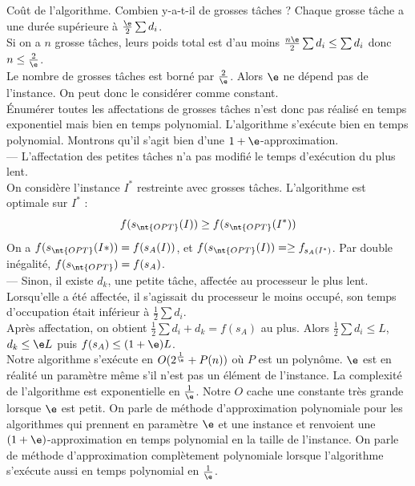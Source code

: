 \documentclass[french, 11pt]{article}
\begin{document}
\begin{prop}{Coût de l'algorithme.}{}
    Combien y-a-t-il de grosses tâches ?
    \tcblower
    Chaque grosse tâche a une durée supérieure à $\frac{\e}{2}\sum d_i$.\\
    Si on a $n$ grosse tâches, leurs poids total est d'au moins $\frac{n\e}{2}\sum d_i\leq\sum d_i$ donc $n\leq\frac{2}{\e}$.\\
    Le nombre de grosses tâches est borné par $\frac{2}{\e}$. Alors $\e$ ne dépend pas de l'instance. On peut donc le considérer comme constant.\\
    Énumérer toutes les affectations de grosses tâches n'est donc pas réalisé en temps exponentiel mais bien en temps polynomial. L'algorithme s'exécute bien en temps polynomial. Montrons qu'il s'agit bien d'une $1+\e$-approximation.\\
    --- L'affectation des petites tâches n'a pas modifié le temps d'exécution du plus lent.\\
    On considère l'instance $I^*$ restreinte avec grosses tâches. L'algorithme est optimale sur $I^*$ :
    \begin{equation*}
        f(s_{\nt{OPT}}(I)) \geq f(s_{\nt{OPT}}(I^*))
    \end{equation*}
    On a $f(s_{\nt{OPT}}(I*))=f(s_A(I))$, et $f(s_{\nt{OPT}}(I))=\geq f_{s_A(I^*)}$. Par double inégalité, $f(s_{\nt{OPT}})=f(s_A)$.\\
    --- Sinon, il existe $d_k$, une petite tâche, affectée au processeur le plus lent. Lorsqu'elle a été affectée, il s'agissait du processeur le moins occupé, son temps d'occupation était inférieur à $\frac{1}{2}\sum d_i$.\\
    Après affectation, on obtient $\frac{1}{2}\sum d_i+d_k=f(s_A)$ au plus. Alors $\frac{1}{2}\sum d_i \leq L$, $d_k\leq \e L$ puis $f(s_A)\leq (1+\e)L$.\\
    Notre algorithme s'exécute en $O(2^{\frac{1}{\e}}+P(n))$ où $P$ est un polynôme. $\e$ est en réalité un paramètre même s'il n'est pas un élément de l'instance. La complexité de l'algorithme est exponentielle en $\frac{1}{\e}$. Notre $O$ cache une constante très grande lorsque $\e$ est petit. On parle de méthode d'approximation polynomiale pour les algorithmes qui prennent en paramètre $\e$ et une instance et renvoient une $(1+\e)$-approximation en temps polynomial en la taille de l'instance. On parle de méthode d'approximation complètement polynomiale lorsque l'algorithme s'exécute aussi en temps polynomial en $\frac{1}{\e}$. 
\end{prop}
\end{document}
